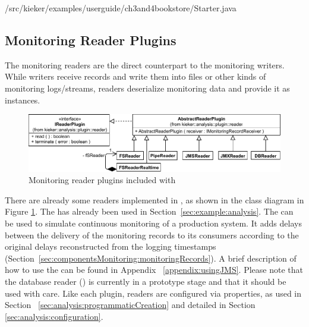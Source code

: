\medskip

\setJavaCodeListing
%
{\customComponentsBookstoreApplicationDir/src/kieker/examples/userguide/ch3and4bookstore/Starter.java}

\enlargethispage{0.5cm}

\subsection{Monitoring Reader Plugins}

The monitoring readers are the direct counterpart to the monitoring %
writers. While writers receive records and write them into files or other kinds %
of monitoring logs/streams, readers deserialize monitoring data and provide it as %
 instances.

\begin{figure}\centering
\includegraphics[scale=0.7]{images/kieker_readerimplsuserguide-modified}
\caption{Monitoring reader plugins included with \Kieker{}}
\label{Figure:ReaderHierarchy}
\end{figure}


%
%


\noindent There are already some readers implemented in \Kieker,  as shown in the %
class diagram in Figure \ref{Figure:ReaderHierarchy}. %
The  has already been used in Section~\ref{sec:example:analysis}. %
The  can be used to simulate continuous monitoring of a %
production system. It adds delays between the delivery of the monitoring records %
to its consumers according to the original delays reconstructed from the logging %
timestamps (Section~\ref{sec:componentsMonitoring:monitoringRecords}).
A brief description of how to use the  can be found in Appendix~%
\ref{appendix:usingJMS}. Please note that the database reader () %
is currently in a prototype stage and that it should be used with care. %
Like each plugin, readers are configured via properties, as used in Section~%
\ref{sec:analysis:programmaticCreation} and detailed in Section~%
\ref{sec:analysis:configuration}.

